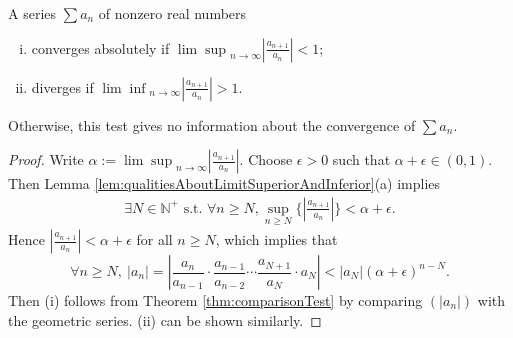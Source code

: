 \begin{thm}
  \label{thm:ratioTest}
  A series $\sum a_n$ of nonzero real numbers 
  \begin{enumerate}[(i)]\itemsep0em
  \item converges absolutely if
    ${\lim\sup}_{n\rightarrow\infty}|\frac{a_{n+1}}{a_n}|<1$;
  \item diverges if ${\lim\inf}_{n\rightarrow\infty}|\frac{a_{n+1}}{a_n}|>1$. 
  \end{enumerate}
  Otherwise, this test gives no information
  about the convergence of $\sum a_n$.
\end{thm}
\begin{proof}
  Write $\alpha:={\lim\sup}_{n\rightarrow\infty}|\frac{a_{n+1}}{a_n}|$.
  Choose $\epsilon>0$ such that $\alpha+\epsilon\in(0,1)$.
  Then Lemma \ref{lem:qualitiesAboutLimitSuperiorAndInferior}(a) implies
  \begin{displaymath}
    \begin{array}{l}
    \exists N\in \mathbb{N}^{+} \text{ s.t. }
    \forall n\ge N,
    \sup_{n\ge N}\{\left|\frac{a_{n+1}}{a_{n}}\right|\}<\alpha+\epsilon.
    \end{array}
  \end{displaymath}
  Hence $|\frac{a_{n+1}}{a_{n}}|<\alpha+\epsilon$ for all $n\ge N$,
  which implies that
  \begin{displaymath}
    \forall n\ge N,\ 
    |a_{n}|=\left|\frac{a_{n}}{a_{n-1}}\cdot \frac{a_{n-1}}{a_{n-2}}
     \cdots \frac{a_{N+1}}{a_{N}}\cdot a_{N}  \right|
    <|a_{N}|(\alpha+\epsilon)^{n-N}.
  \end{displaymath}
  Then (i) follows from Theorem \ref{thm:comparisonTest}
  by comparing $(|a_n|)$ with the geometric series.
  (ii) can be shown similarly.
\end{proof}

